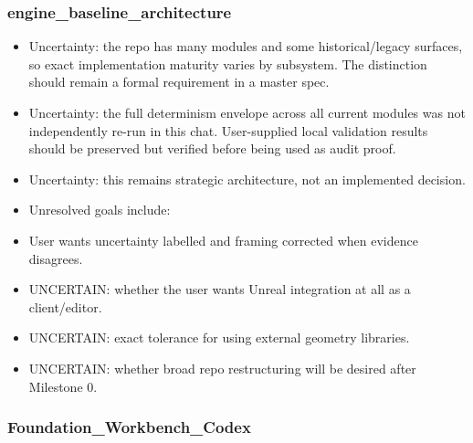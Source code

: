 \documentclass[11pt,a4paper]{report}
\begin{document}
\subsubsection{engine\_baseline\_architecture}

\begin{itemize}
\item Uncertainty: the repo has many modules and some historical/legacy surfaces, so exact implementation maturity varies by subsystem. The distinction should remain a formal requirement in a master spec.
\item Uncertainty: the full determinism envelope across all current modules was not independently re-run in this chat. User-supplied local validation results should be preserved but verified before being used as audit proof.
\item Uncertainty: this remains strategic architecture, not an implemented decision.
\item Unresolved goals include:
\item User wants uncertainty labelled and framing corrected when evidence disagrees.
\item UNCERTAIN: whether the user wants Unreal integration at all as a client/editor.
\item UNCERTAIN: exact tolerance for using external geometry libraries.
\item UNCERTAIN: whether broad repo restructuring will be desired after Milestone 0.
\end{itemize}

\subsubsection{Foundation\_Workbench\_Codex}
\end{document}
